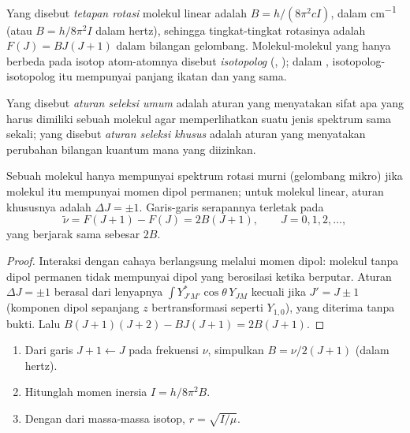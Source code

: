 \begin{definition}\label{def:b3:rovibrational-spectroscopy:rotational-constant}
Yang disebut \emph{tetapan rotasi} molekul linear adalah
$B = h/(8\pi^2cI)$, dalam \unit{cm^{-1}} (atau $B = h/8\pi^2I$ dalam hertz),
sehingga tingkat-tingkat rotasinya adalah $F(J) = BJ(J+1)$ dalam bilangan
gelombang. Molekul-molekul yang hanya berbeda pada isotop atom-atomnya
disebut \emph{isotopolog} (, );
dalam , isotopolog-isotopolog itu mempunyai
panjang ikatan dan  yang sama.
\end{definition}

\begin{definition}\label{def:b3:rovibrational-spectroscopy:selection}
Yang disebut \emph{aturan seleksi umum} adalah
aturan yang menyatakan sifat apa yang harus dimiliki sebuah molekul agar
memperlihatkan suatu jenis spektrum sama sekali; yang disebut \emph{aturan
seleksi khusus} adalah aturan yang menyatakan
perubahan bilangan kuantum mana yang diizinkan.
\end{definition}

\begin{proposition}\label{prop:b3:rovibrational-spectroscopy:rotational-lines}
Sebuah molekul hanya mempunyai spektrum rotasi murni (gelombang mikro) jika
molekul itu mempunyai momen dipol permanen; untuk molekul linear, aturan
khususnya adalah $\Delta J
= \pm1$. Garis-garis serapannya terletak pada
\[
\tilde\nu = F(J+1) - F(J) = 2B(J + 1), \qquad J = 0, 1, 2, \dots,
\]
yang berjarak sama sebesar $2B$.
\end{proposition}

\begin{proof}
Interaksi dengan cahaya berlangsung melalui momen dipol: molekul tanpa dipol
permanen tidak mempunyai dipol yang berosilasi ketika berputar. Aturan
$\Delta J
= \pm1$ berasal dari lenyapnya $\int Y_{J'M'}^*\cos\theta\,Y_{JM}$ kecuali
jika $J' = J
\pm 1$ (komponen dipol sepanjang $z$ bertransformasi seperti
$Y_{1,0}$), yang diterima tanpa bukti. Lalu $B(J+1)(J+2) - BJ(J+1) = 2B(J+1)$.
\end{proof}

\begin{method}\label{met:b3:rovibrational-spectroscopy:bond-length}
\begin{enumerate}
  \item Dari garis $J + 1 \leftarrow J$ pada frekuensi $\nu$, simpulkan
        $B =
        \nu/2(J+1)$ (dalam hertz).
  \item Hitunglah momen inersia $I = h/8\pi^2B$.
  \item Dengan  dari massa-massa isotop, $r = \sqrt{I/\mu}$.
\end{enumerate}
\end{method}

